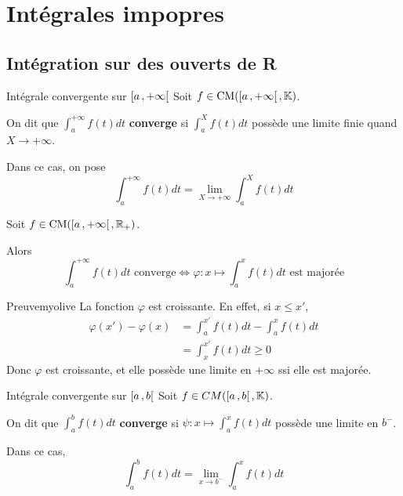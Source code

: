 \section{Intégrales impopres}

\subsection{Intégration sur des ouverts de R}

    \begin{defi}{Intégrale convergente sur $\left[ a \, , +\infty \right[$}{}
        Soit $f \in \operatorname{CM}(\left[ a \, , +\infty \right[,\mathbb{K})$. 

        On dit que $\int_{a}^{+\infty} f(t)dt$ \textbf{converge} si $\int_{a}^{X} f(t)dt$ possède une limite finie quand $X \to +\infty$.

        Dans ce cas, on pose 
        \[ \int_{a}^{+\infty} f(t)dt = \lim_{X \to +\infty} \int_{a}^{X} f(t)dt \]
    \end{defi}

    \begin{prop}{}{}
        Soit $f \in \operatorname{CM}(\left[ a \, , +\infty \right[,\mathbb{R}_+)$.

        Alors 
        \[ \int_{a}^{+\infty} f(t)dt \text{ converge} \iff \varphi : x \mapsto \int_{a}^{x} f(t)dt \text{ est majorée} \]
    \end{prop}

    \begin{demo}{Preuve}{myolive}
        La fonction $\varphi$ est croissante. En effet, si $x \leq x'$, 
        \begin{align*}
            \varphi(x') - \varphi(x) 
            &= \int_{a}^{x'} f(t)dt - \int_{a}^{x} f(t)dt \\
            &= \int_{x}^{x'} f(t)dt \geq 0
        \end{align*}
        Donc $\varphi$ est croissante, et elle possède une limite en $+\infty$ ssi elle est majorée.
    \end{demo}

    \begin{defi}{Intégrale convergente sur $\left[ a \, , b \right[$}{}
        Soit $f \in CM(\left[ a \, , b \right[,\mathbb{K})$.

        On dit que $\int_{a}^{b} f(t)dt$ \textbf{converge} si $\psi : x \mapsto \int_{a}^{x} f(t)dt$ possède une limite en $b^-$.

        Dans ce cas, 
        \[ \int_{a}^{b} f(t)dt = \lim_{x \to b^-} \int_{a}^{x}f(t)dt \]
    \end{defi}

